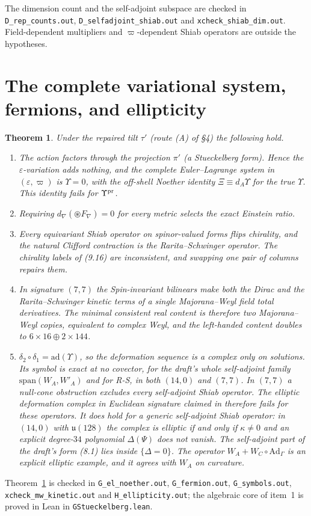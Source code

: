\documentclass[11pt]{article}
\newtheorem{theorem}{Theorem}
\theoremstyle{remark}
\begin{document}
The dimension count and the self-adjoint subspace are checked in \texttt{D\_rep\_counts.out}, \texttt{D\_selfadjoint\_shiab.out} and \texttt{xcheck\_shiab\_dim.out}. Field-dependent multipliers and $\varpi$-dependent Shiab operators are outside the hypotheses.

\section{The complete variational system, fermions, and ellipticity}
\begin{theorem}\label{thm:full}
Under the repaired tilt $\tau'$ (route (A) of \S4) the following hold.
\begin{enumerate}
\item The action factors through the projection $\pi'$ (a Stueckelberg form). Hence the $\varepsilon$-variation adds nothing, and the complete Euler--Lagrange system in $(\varepsilon,\varpi)$ is $\Upsilon=0$, with the off-shell Noether identity $\Xi\equiv d_A\Upsilon$ for the true $\Upsilon$. This identity fails for $\Upsilon^{\rm pr}$.
\item Requiring $d_\nabla(\circledast F_\nabla)=0$ for every metric selects the exact Einstein ratio.
\item Every equivariant Shiab operator on spinor-valued forms flips chirality, and the natural Clifford contraction is the Rarita--Schwinger operator. The chirality labels of (9.16) are inconsistent, and swapping one pair of columns repairs them.
\item In signature $(7,7)$ the Spin-invariant bilinears make both the Dirac and the Rarita--Schwinger kinetic terms of a single Majorana--Weyl field total derivatives. The minimal consistent real content is therefore two Majorana--Weyl copies, equivalent to complex Weyl, and the left-handed content doubles to $6\times16\oplus2\times144$.
\item $\delta_2\circ\delta_1=\mathrm{ad}(\Upsilon)$, so the deformation sequence is a complex only on solutions. Its symbol is exact at no covector, for the draft's whole self-adjoint family $\mathrm{span}(W_A,W'_A)$ and for R-S, in both $(14,0)$ and $(7,7)$. In $(7,7)$ a null-cone obstruction excludes every self-adjoint Shiab operator. The elliptic deformation complex in Euclidean signature claimed in \cite[\S12, item (x), p.~65]{W21} therefore fails for these operators. It does hold for a generic self-adjoint Shiab operator: in $(14,0)$ with $\mathfrak u(128)$ the complex is elliptic if and only if $\kappa\neq0$ and an explicit degree-$34$ polynomial $\Delta(\Psi)$ does not vanish. The self-adjoint part of the draft's form (8.1) lies inside $\{\Delta=0\}$. The operator $W_A+W_C\circ\mathrm{Ad}_\Gamma$ is an explicit elliptic example, and it agrees with $W_A$ on curvature.
\end{enumerate}
\end{theorem}
Theorem~\ref{thm:full} is checked in \texttt{G\_el\_noether.out}, \texttt{G\_fermion.out}, \texttt{G\_symbols.out}, \texttt{xcheck\_mw\_kinetic.out} and \texttt{H\_ellipticity.out}; the algebraic core of item~1 is proved in Lean in \texttt{GStueckelberg.lean}.
\end{document}
